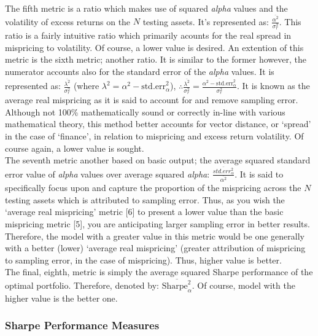 \documentclass[11pt, english]{article}
\begin{document}
        The fifth metric is a ratio which makes use of squared \textit{alpha} values and the volatility of excess returns on the $N$ testing assets. It's represented as: $\frac{\overline{\alpha^2}}{\sigma_r^2}$. This ratio is a fairly intuitive ratio which primarily acounts for the real spread in mispricing to volatility. Of course, a lower value is desired. An extention of this metric is the sixth metric; another ratio. It is similar to the former however, the numerator accounts also for the standard error of the \textit{alpha} values. It is represented as: $\frac{\overline{\lambda^2}}{\sigma_r^2}$ (where $\lambda^2=\alpha^2-\textrm{std.err}_{\alpha}^2$), $\therefore\frac{\overline{\lambda^2}}{\sigma_r^2}=\frac{\overline{\alpha^2-\textrm{std.err}_{\alpha}^2}}{\sigma_r^2}$. It is known as the average real mispricing as it is said to account for and remove sampling error. Although not 100\% mathematically sound or correctly in-line with various mathematical theory, this method better accounts for vector distance, or `spread' in the case of `finance', in relation to mispricing and excess return volatility. Of course again, a lower value is sought.\\

        The seventh metric another based on basic output; the average squared standard error value of \textit{alpha} values over average squared \textit{alpha}: $\frac{\overline{std.err_{\alpha}^2}}{\overline{\alpha^2}}$. It is said to specifically focus upon and capture the proportion of the mispricing across the $N$ testing assets which is attributed to sampling error. Thus, as you wish the `average real mispricing' metric [6] to present a lower value than the basic mispricing metric [5], you are anticipating larger sampling error in better results. Therefore, the model with a greater value in this metric would be one generally with a better (lower) `average real mispricing' (greater attribution of mispricing to sampling error, in the case of mispricing). Thus, higher value is better.\\

        The final, eighth, metric is simply the average squared Sharpe performance of the optimal portfolio. Therefore, denoted by: $\overline{\textrm{Sharpe}_{\alpha}^2}$. Of course, model with the higher value is the better one.

		\subsubsection*{Sharpe Performance Measures}
\end{document}
